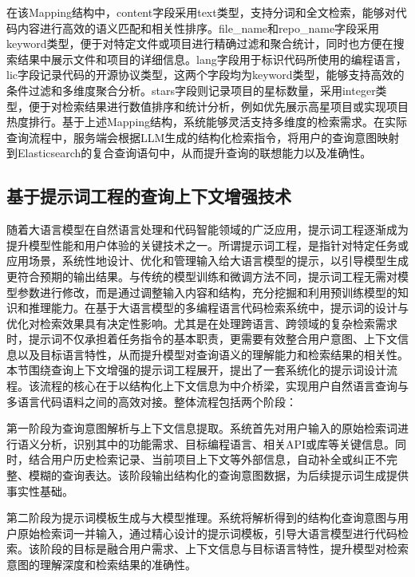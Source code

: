 \documentclass[UTF8,a4paper,12pt]{ctexart}
\numberwithin{equation}{section}
\begin{document}
在该Mapping结构中，content字段采用text类型，支持分词和全文检索，能够对代码内容进行高效的语义匹配和相关性排序。file\_name和repo\_name字段采用keyword类型，便于对特定文件或项目进行精确过滤和聚合统计，同时也方便在搜索结果中展示文件和项目的详细信息。lang字段用于标识代码所使用的编程语言，lic字段记录代码的开源协议类型，这两个字段均为keyword类型，能够支持高效的条件过滤和多维度聚合分析。stars字段则记录项目的星标数量，采用integer类型，便于对检索结果进行数值排序和统计分析，例如优先展示高星项目或实现项目热度排行。基于上述Mapping结构，系统能够灵活支持多维度的检索需求。在实际查询流程中，服务端会根据LLM生成的结构化检索指令，将用户的查询意图映射到Elasticsearch的复合查询语句中，从而提升查询的联想能力以及准确性。
\subsection{基于提示词工程的查询上下文增强技术}
随着大语言模型在自然语言处理和代码智能领域的广泛应用，提示词工程逐渐成为提升模型性能和用户体验的关键技术之一。所谓提示词工程，是指针对特定任务或应用场景，系统性地设计、优化和管理输入给大语言模型的提示，以引导模型生成更符合预期的输出结果。与传统的模型训练和微调方法不同，提示词工程无需对模型参数进行修改，而是通过调整输入内容和结构，充分挖掘和利用预训练模型的知识和推理能力。在基于大语言模型的多编程语言代码检索系统中，提示词的设计与优化对检索效果具有决定性影响。尤其是在处理跨语言、跨领域的复杂检索需求时，提示词不仅承担着任务指令的基本职责，更需要有效整合用户意图、上下文信息以及目标语言特性，从而提升模型对查询语义的理解能力和检索结果的相关性。本节围绕查询上下文增强的提示词工程展开，提出了一套系统化的提示词设计流程。该流程的核心在于以结构化上下文信息为中介桥梁，实现用户自然语言查询与多语言代码语料之间的高效对接。整体流程包括两个阶段：\par
第一阶段为查询意图解析与上下文信息提取。系统首先对用户输入的原始检索词进行语义分析，识别其中的功能需求、目标编程语言、相关API或库等关键信息。同时，结合用户历史检索记录、当前项目上下文等外部信息，自动补全或纠正不完整、模糊的查询表达。该阶段输出结构化的查询意图数据，为后续提示词生成提供事实性基础。\par
第二阶段为提示词模板生成与大模型推理。系统将解析得到的结构化查询意图与用户原始检索词一并输入，通过精心设计的提示词模板，引导大语言模型进行代码检索。该阶段的目标是融合用户需求、上下文信息与目标语言特性，提升模型对检索意图的理解深度和检索结果的准确性。\par
\end{document}

